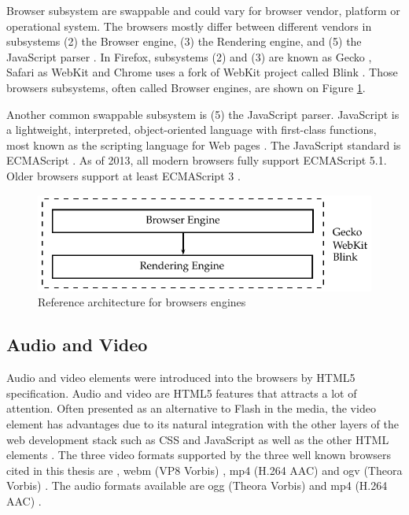 Browser subsystem are swappable \cite{Grosskurth2005} and could vary for browser vendor, platform or operational system. The browsers mostly differ between different vendors in subsystems (2) the Browser engine, (3) the Rendering engine, and (5) the JavaScript parser  \cite{Firefox2013} \cite{Safari2013} \cite{WebKit2013} \cite{Chrome2010}. In Firefox, subsystems (2) and (3) are known as Gecko \cite{Firefox2013} \cite{Gecko2013}, Safari as WebKit \cite{Safari2013} \cite{WebKit2013} and Chrome uses a fork of WebKit project called Blink \cite{Chrome2010} \cite{Blink2013}. Those browsers subsystems, often called Browser engines, are shown on Figure \ref{figure:web_architecture_engines}.

Another common swappable subsystem is (5) the JavaScript parser. JavaScript is a lightweight, interpreted, object-oriented language with first-class functions, most known as the scripting language for Web pages \cite{Gecko2013}. The JavaScript standard is ECMAScript \cite{Gecko2013} \cite{International2009}. As of 2013, all modern browsers fully support ECMAScript 5.1. Older browsers support at least ECMAScript 3 \cite{Gecko2013} \cite{International2009}.

\begin{figure}[!htb]
  \centering
  \includegraphics{chapters/basic_concepts/web_architecture_engines.pdf}
  \caption{Reference architecture for browsers engines}
  \label{figure:web_architecture_engines}
\end{figure}


\subsection{Audio and Video} %
\label{sub:basic_concepts:web:audio_and_video}

Audio and video elements were introduced into the browsers by HTML5 \cite{Hickson2013} specification. Audio and video are HTML5 \cite{Hickson2013} features that attracts a lot of attention. Often presented as an alternative to Flash \cite{Flash2013} in the media, the video element has advantages due to its natural integration with the other layers of the web development stack such as CSS \cite{CSS2013} and JavaScript \cite{International2009} as well as the other HTML elements \cite{WC2006}. The three video formats supported by the three well known browsers cited in this thesis are \cite{WC2006} \cite{Rocks2013}, webm (VP8 Vorbis) \cite{Vorbis2012}, mp4 (H.264 AAC) \cite{AAC2006} and ogv (Theora Vorbis) \cite{Theora2011}. The audio formats available are ogg (Theora Vorbis) \cite{Theora2011} and mp4 (H.264 AAC) \cite{AAC2006}.

